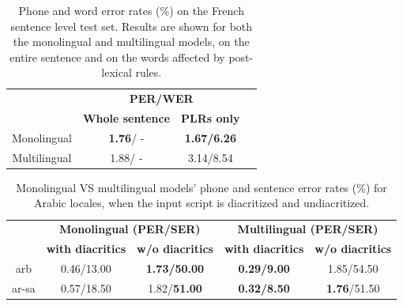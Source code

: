 \begin{table}[t]
\centering
\begin{tabular}{cccc}

\hline
 &

\multicolumn{2}{c}{\textbf{PER/WER}} \\
 &
\textbf{Whole sentence} &
\textbf{PLRs only}
\\

\hline

Monolingual &  
\textbf{1.76}/ - &
\textbf{1.67/6.26}
\\

Multilingual & 
1.88/ - &
3.14/8.54
\\
\hline

\end{tabular}
\caption{Phone and word error rates (\%) on the French sentence level test set. Results are shown for both the monolingual and multilingual models, on the entire sentence and on the words affected by post-lexical rules.}
\label{table:french}
\end{table}


\begin{table}[t]
\centering
\begin{tabular}{ccccc}
\hline
 &

\multicolumn{2}{c}{\textbf{Monolingual (PER/SER)}} &
\multicolumn{2}{c}{\textbf{Multilingual (PER/SER)}} \\

&
\textbf{with diacritics} &
\textbf{w/o diacritics} &
\textbf{with diacritics} &
\textbf{w/o diacritics} \\

\hline
arb & 
0.46/13.00 & 
\textbf{1.73/50.00} & 
\textbf{0.29/9.00} & 
1.85/54.50 \\

ar-sa & 
0.57/18.50 & 
1.82/\textbf{51.00} & 
\textbf{0.32/8.50} & 
\textbf{1.76}/51.50 \\

\hline
\end{tabular}
\caption{Monolingual VS multilingual models' phone and sentence error rates (\%) for Arabic locales, when the input script is diacritized and undiacritized.}
\label{table:arabic}
\end{table}



